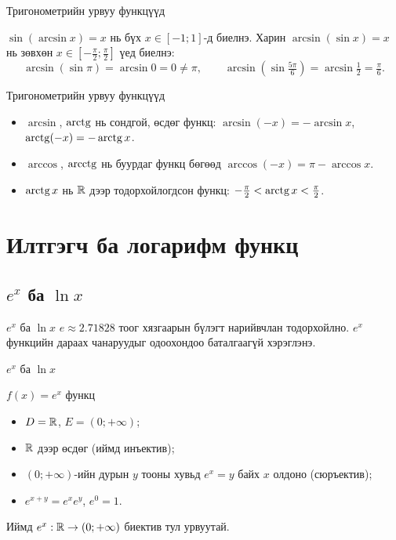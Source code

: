 \begin{frame}[allowframebreaks]{Тригонометрийн урвуу функцүүд}
\begin{remark}
$\sin(\arcsin x)=x$ нь бүх $x\in[-1;1]$-д биелнэ. Харин
$\arcsin(\sin x)=x$ нь зөвхөн $x\in\left[-\frac{\pi}{2};\frac{\pi}{2}\right]$ үед биелнэ:
\[
\arcsin(\sin\pi)=\arcsin 0=0\neq\pi,\qquad
\arcsin\!\left(\sin\tfrac{5\pi}{6}\right)=\arcsin\tfrac12=\tfrac{\pi}{6}.
\]
\end{remark}
\end{frame}

\begin{frame}[allowframebreaks]{Тригонометрийн урвуу функцүүд}
\begin{example}[Чанарууд]
\leavevmode
\begin{itemize}
  \item $\arcsin$, $\operatorname{arctg}$ нь сондгой, өсдөг функц:
        $\arcsin(-x)=-\arcsin x$, $\operatorname{arctg}(-x)=-\operatorname{arctg} x$.
  \item $\arccos$, $\operatorname{arcctg}$ нь буурдаг функц бөгөөд
        $\arccos(-x)=\pi-\arccos x$.
  \item $\operatorname{arctg} x$ нь $\mathbb{R}$ дээр тодорхойлогдсон  функц:
        $-\frac{\pi}{2}<\operatorname{arctg} x<\frac{\pi}{2}$.
\end{itemize}
\end{example}
\end{frame}

\section{Илтгэгч ба логарифм функц}
\subsection{$e^x$ ба $\ln x$}
\begin{frame}[allowframebreaks]{$e^x$ ба $\ln x$}
$e\approx2.71828$ тоог хязгаарын бүлэгт нарийвчлан тодорхойлно. $e^x$ функцийн
дараах чанаруудыг одоохондоо баталгаагүй хэрэглэнэ.
\end{frame}

\begin{frame}[allowframebreaks]{$e^x$ ба $\ln x$}
\begin{theorem}
$f(x)=e^x$ функц
\begin{itemize}
  \item $D=\mathbb{R}$, $E=(0;+\infty)$;
  \item $\mathbb{R}$ дээр өсдөг (иймд инъектив);
  \item $(0;+\infty)$-ийн дурын $y$ тооны хувьд $e^x=y$ байх $x$ олдоно (сюръектив);
  \item $e^{x+y}=e^xe^y$, \; $e^0=1$.
\end{itemize}
\end{theorem}

Иймд $e^x:\mathbb{R}\to(0;+\infty)$ биектив тул урвуутай.
\end{frame}

